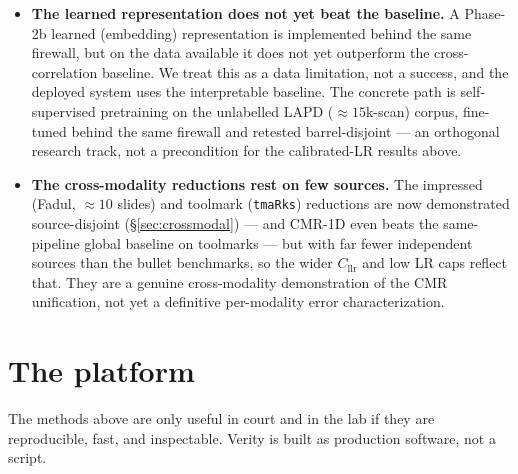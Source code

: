 \documentclass[11pt]{article}
\newcommand{\Cllr}{C_{\mathrm{llr}}}
\newcommand{\code}[1]{\texttt{#1}}
\begin{document}
\begin{itemize}
        error rate of firearms identification.'' Every number is conditioned on a
        named population and a stated protocol. This is the intended reading of our
        answer to Cuellar et al., not a hedge.
  \item \textbf{The learned representation does not yet beat the baseline.} A
        Phase-2b learned (embedding) representation is implemented behind the same
        firewall, but on the data available it does not yet outperform the
        cross-correlation baseline. We treat this as a data limitation, not a
        success, and the deployed system uses the interpretable baseline. The concrete
        path is self-supervised pretraining on the unlabelled LAPD ($\approx\!15$k-scan)
        corpus, fine-tuned behind the same firewall and retested barrel-disjoint --- an
        orthogonal research track, not a precondition for the calibrated-LR results above.
  \item \textbf{The cross-modality reductions rest on few sources.} The impressed
        (Fadul, $\approx\!10$ slides) and toolmark (\code{tmaRks}) reductions are now
        demonstrated source-disjoint (\S\ref{sec:crossmodal}) --- and CMR-1D even beats
        the same-pipeline global baseline on toolmarks --- but with far fewer independent
        sources than the bullet benchmarks, so the wider $\Cllr$ and low LR caps
        reflect that. They are a genuine cross-modality demonstration of the CMR
        unification, not yet a definitive per-modality error characterization.
\end{itemize}

\section{The platform}
\label{sec:platform}

The methods above are only useful in court and in the lab if they are reproducible,
fast, and inspectable. Verity is built as production software, not a script.
\end{document}
